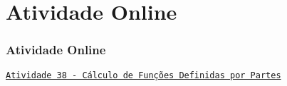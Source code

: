 \section{Atividade Online}
\begin{frame}
\frametitle{Atividade Online} 

\href{https://pt.khanacademy.org/math/algebra-home/alg-functions/alg-piecewise-functions/e/evaluating-piecewise-functions}
{{\tt Atividade 38 - Cálculo de Funções Definidas por Partes}}



\end{frame}